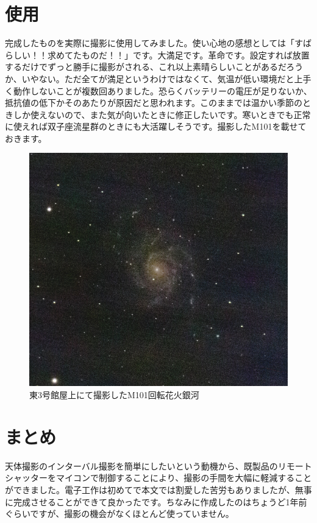 \documentclass[../main]{subfiles}
\begin{document}
\section{使用}
完成したものを実際に撮影に使用してみました。使い心地の感想としては「すばらしい！！求めてたものだ！！」です。大満足です。革命です。設定すれば放置するだけでずっと勝手に撮影がされる、これ以上素晴らしいことがあるだろうか、いやない。ただ全てが満足というわけではなくて、気温が低い環境だと上手く動作しないことが複数回ありました。恐らくバッテリーの電圧が足りないか、抵抗値の低下かそのあたりが原因だと思われます。このままでは温かい季節のときしか使えないので、また気が向いたときに修正したいです。寒いときでも正常に使えれば双子座流星群のときにも大活躍しそうです。撮影したM101を載せておきます。
\begin{figure}[H]
    \centering
    \includegraphics[width=0.5\linewidth]{sections/Maruyama/figure/M101_0529_4.jpg}
    \caption{東3号館屋上にて撮影したM101回転花火銀河}
\end{figure}


\section{まとめ}
天体撮影のインターバル撮影を簡単にしたいという動機から、既製品のリモートシャッターをマイコンで制御することにより、撮影の手間を大幅に軽減することができました。電子工作は初めてで本文では割愛した苦労もありましたが、無事に完成させることができて良かったです。ちなみに作成したのはちょうど1年前ぐらいですが、撮影の機会がなくほとんど使っていません。

\end{document}
